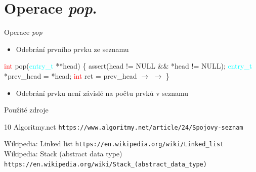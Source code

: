\documentclass[10pt, hyperref={unicode}]{beamer}
\begin{document}
\section{Operace \textit{pop}.}

\begin{frame}[fragile]{Operace \textit{pop}}

    \begin{itemize}
        \item Odebrání prvního prvku ze seznamu
    \end{itemize}  
    \textcolor{red}{int} pop(\textcolor{cyan}{entry\_t} **head) \newline
    \{ \newline
    \hspace*{4mm} assert(head != \textcolor{keywordpurple}{NULL} \&\& *head != \textcolor{keywordpurple}{NULL}); \newline
    \hspace*{4mm} \textcolor{cyan}{entry\_t} *prev\_head = *head; \newline
    \hspace*{5mm}\textcolor{red}{int} ret = prev\_head $\rightarrow$  \newline
    \hspace*{5mm}  $\rightarrow$  \newline
    \hspace*{5mm} 
    \newline
    \hspace*{5mm}  \newline
    \}
    
    \begin{itemize}
        \item Odebrání prvku není závislé na počtu prvků v seznamu
    \end{itemize}
\end{frame}



\begin{frame}{Použité zdroje}
	\begin{thebibliography}{10}
		 Algoritmy.net		\newblock \texttt{https://www.algoritmy.net/article/24/Spojovy-seznam}

		 Wikipedia: Linked list
		\newblock \texttt{https://en.wikipedia.org/wiki/Linked\_list}
		 Wikipedia: Stack (abstract data type)
		\newblock \texttt{https://en.wikipedia.org/wiki/Stack\_(abstract\_data\_type)}
	\end{thebibliography}
\end{frame}
\end{document}
